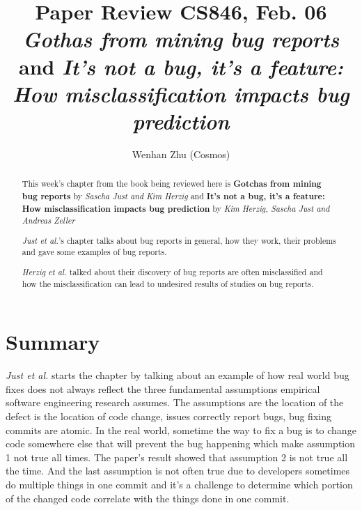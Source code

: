 \documentclass[sigconf]{acmart}
\begin{document}
\title{Paper Review CS846, Feb. 06\\
    {\it Gothas from mining bug reports} \\
    and {\it It's not a bug, it's a feature: How misclassification impacts bug prediction}
}

\author{Wenhan Zhu (Cosmos)}

\begin{abstract}

    This week's chapter from the book being reviewed here is {\bf Gotchas from mining bug reports} by {\it Sascha Just and Kim Herzig} and {\bf It's not a bug, it's a feature: How misclassification impacts bug prediction} by {\it Kim Herzig, Sascha Just and Andreas Zeller}

    {\it Just et al.}'s chapter talks about bug reports in general, how they work, their problems and gave some examples of bug reports.

    {\it Herzig et al.} talked about their discovery of bug reports are often misclassified and how the misclassification can lead to undesired results of studies on bug reports. 

\end{abstract}


\maketitle

\section{Summary}

{\it Just et al.} starts the chapter by talking about an example of how real world bug fixes does not always reflect the three fundamental assumptions empirical software engineering research assumes. The assumptions are the location of the defect is the location of code change, issues correctly report bugs, bug fixing commits are atomic. In the real world, sometime the way to fix a bug is to change code somewhere else that will prevent the bug happening which make assumption 1 not true all times. The paper's result showed that assumption 2 is not true all the time. And the last assumption is not often true due to developers sometimes do multiple things in one commit and it's a challenge to determine which portion of the changed code correlate with the things done in one commit. 
\end{document}
